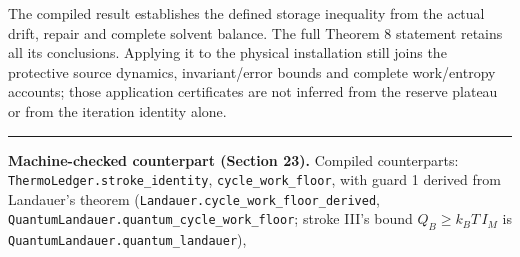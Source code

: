 \documentclass[
]{article}
\begin{document}
The compiled result establishes the defined storage inequality from the
actual drift, repair and complete solvent balance. The full Theorem 8
statement retains all its conclusions. Applying it to the physical
installation still joins the protective source dynamics,
i\allowbreak{}n\allowbreak{}v\allowbreak{}a\allowbreak{}r\allowbreak{}i\allowbreak{}a\allowbreak{}n\allowbreak{}t\allowbreak{}/\allowbreak{}e\allowbreak{}r\allowbreak{}r\allowbreak{}o\allowbreak{}r
bounds and complete work/entropy accounts; those application
certificates are not inferred from the reserve plateau or from the
iteration identity alone.

\begin{center}\rule{0.5\linewidth}{0.5pt}\end{center}

\textbf{Machine-checked counterpart (Section 23).} Compiled
counterparts:
\texttt{T\allowbreak{}h\allowbreak{}e\allowbreak{}r\allowbreak{}m\allowbreak{}o\allowbreak{}L\allowbreak{}e\allowbreak{}d\allowbreak{}g\allowbreak{}e\allowbreak{}r\allowbreak{}.\allowbreak{}s\allowbreak{}t\allowbreak{}r\allowbreak{}o\allowbreak{}k\allowbreak{}e\allowbreak{}\_\allowbreak{}i\allowbreak{}d\allowbreak{}e\allowbreak{}n\allowbreak{}t\allowbreak{}i\allowbreak{}t\allowbreak{}y},
\texttt{cycle\_work\_floor}, with guard 1 derived from Landauer's
theorem
(\texttt{L\allowbreak{}a\allowbreak{}n\allowbreak{}d\allowbreak{}a\allowbreak{}u\allowbreak{}e\allowbreak{}r\allowbreak{}.\allowbreak{}c\allowbreak{}y\allowbreak{}c\allowbreak{}l\allowbreak{}e\allowbreak{}\_\allowbreak{}w\allowbreak{}o\allowbreak{}r\allowbreak{}k\allowbreak{}\_\allowbreak{}f\allowbreak{}l\allowbreak{}o\allowbreak{}o\allowbreak{}r\allowbreak{}\_\allowbreak{}d\allowbreak{}e\allowbreak{}r\allowbreak{}i\allowbreak{}v\allowbreak{}e\allowbreak{}d},
\texttt{Q\allowbreak{}u\allowbreak{}a\allowbreak{}n\allowbreak{}t\allowbreak{}u\allowbreak{}m\allowbreak{}L\allowbreak{}a\allowbreak{}n\allowbreak{}d\allowbreak{}a\allowbreak{}u\allowbreak{}e\allowbreak{}r\allowbreak{}.\allowbreak{}q\allowbreak{}u\allowbreak{}a\allowbreak{}n\allowbreak{}t\allowbreak{}u\allowbreak{}m\allowbreak{}\_\allowbreak{}c\allowbreak{}y\allowbreak{}c\allowbreak{}l\allowbreak{}e\allowbreak{}\_\allowbreak{}w\allowbreak{}o\allowbreak{}r\allowbreak{}k\allowbreak{}\_\allowbreak{}f\allowbreak{}l\allowbreak{}o\allowbreak{}o\allowbreak{}r};
stroke III's bound \(Q_B \ge k_B T\, I_M\) is
\texttt{Q\allowbreak{}u\allowbreak{}a\allowbreak{}n\allowbreak{}t\allowbreak{}u\allowbreak{}m\allowbreak{}L\allowbreak{}a\allowbreak{}n\allowbreak{}d\allowbreak{}a\allowbreak{}u\allowbreak{}e\allowbreak{}r\allowbreak{}.\allowbreak{}q\allowbreak{}u\allowbreak{}a\allowbreak{}n\allowbreak{}t\allowbreak{}u\allowbreak{}m\allowbreak{}\_\allowbreak{}l\allowbreak{}a\allowbreak{}n\allowbreak{}d\allowbreak{}a\allowbreak{}u\allowbreak{}e\allowbreak{}r}),
\end{document}
